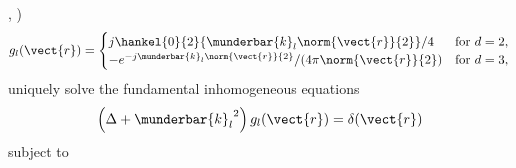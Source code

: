 \cite[(2.14) and (2.19)]{book:Devaney2012},
\cite[(3.14) and (3.15)]{book:Natterer2001}%
)
\begin{equation}
  g_{l}( \vect{r} )
  =
  \begin{cases}
    j \hankel{0}{2}{ \munderbar{k}_{l} \norm{ \vect{r} }{2} } / 4
    & \text{for } d = 2,\\
    -
    e^{ - j \munderbar{k}_{l} \norm{ \vect{r} }{2} } / ( 4 \pi \norm{ \vect{r} }{2} )
    & \text{for } d = 3,
  \end{cases}
 \label{eqn:app_helmholtz_green_free_space_2_3_dim}
\end{equation}
uniquely solve
the fundamental inhomogeneous  equations
\begin{equation*}
  \left( \Delta + {\munderbar{k}_{l}}^{2} \right)
  g_{l}( \vect{r} )
  =
  \delta( \vect{r} )
 \label{eqn:app_helmholtz_fund_n_dim}
\end{equation*}
subject to
